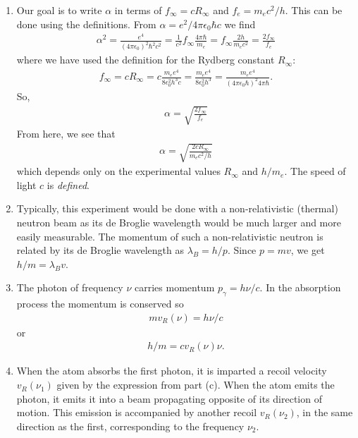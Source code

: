 \documentclass{article}
\theoremstyle{definition}
\newcommand{\al}{\alpha}
\newcommand{\f}[2]{\frac{#1}{#2}}
\begin{document}
\begin{enumerate}[label=\alph*)]

\item Our goal is to write $\al$ in terms of $f_\infty = cR_\infty$ and $f_e = m_ec^2/h$. This can be done using the definitions. From $\al =e^2/4\pi \epsilon_0 \hbar c$ we find 
	\begin{align*}
	\al^2 = \f{e^4}{(4\pi \epsilon_0)^2 \hbar^2 c^2} = \f{1}{c^2} f_\infty \f{4\pi \hbar}{m_e} = f_\infty \f{2h}{m_ec^2} = \f{2f_\infty}{f_e}
	\end{align*} 
	where we have used the definition for the Rydberg constant $R_\infty$:
	\begin{align*}
	f_\infty = c R_\infty = c\f{m_ee^4}{8 \epsilon_0^2 h^3 c }  =\f{m_ee^4}{8 \epsilon_0^2 h^3 } = \f{m_ee^4}{(4\pi\epsilon_0 \hbar )^2 4\pi \hbar }.
	\end{align*}
	So, 
	\begin{align*}
	\boxed{\al = \sqrt{\f{2f_\infty}{f_e} }}
	\end{align*}
	From here, we see that 
	\begin{align*}
	\al = \sqrt{\f{2cR_\infty}{m_e c^2/h}}
	\end{align*}
	which depends only on the experimental values $R_\infty$ and $h/m_e$. The speed of light $c$ is \textit{defined}. 

\item Typically, this experiment would be done with a non-relativistic (thermal) neutron beam as
its de Broglie wavelength would be much larger and more easily measurable. The momentum
of such a non-relativistic neutron is related by its de Broglie wavelength as $\lambda_B = h/p$. Since $p = mv$, we get $h/m = \lambda_B v$.

\item The photon of frequency $\nu$ carries momentum $p_\gamma = h\nu/c$. In the absorption process the momentum is conserved so
\begin{align*}
mv_R(\nu) = h\nu/c
\end{align*}
or 
\begin{align*}
h/m = cv_R(\nu)\nu.
\end{align*}

\item When the atom absorbs the first photon, it is imparted a recoil velocity $v_R(\nu_1)$ given by the expression from part (c). When the atom emits the photon, it emits it into a beam propagating opposite of its direction of motion. This emission is accompanied by another recoil $v_R(\nu_2)$, in the same direction as the first, corresponding to the frequency $\nu_2$. 


\end{enumerate}
\end{document}
